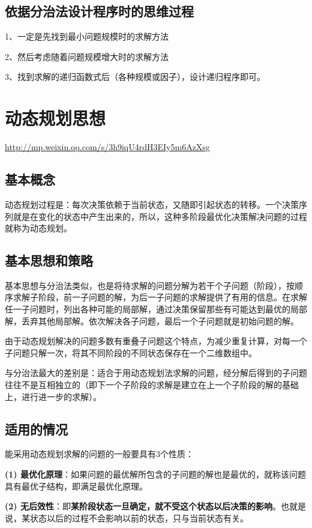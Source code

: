 \documentclass[UTF8,a4paper,12pt]{ctexbook}
\begin{document}
		\subsection{依据分治法设计程序时的思维过程}
			1、一定是先找到最小问题规模时的求解方法
			
			2、然后考虑随着问题规模增大时的求解方法
			
			3、找到求解的递归函数式后（各种规模或因子），设计递归程序即可。
	\section{动态规划思想}
		\url{http://mp.weixin.qq.com/s/3h9iqU4rdH3EIy5m6AzXsg}
		
		\subsection{基本概念}
			动态规划过程是：每次决策依赖于当前状态，又随即引起状态的转移。一个决策序列就是在变化的状态中产生出来的，所以，这种多阶段最优化决策解决问题的过程就称为动态规划。
			
		\subsection{基本思想和策略}
			基本思想与分治法类似，也是将待求解的问题分解为若干个子问题（阶段），按顺序求解子阶段，前一子问题的解，为后一子问题的求解提供了有用的信息。在求解任一子问题时，列出各种可能的局部解，通过决策保留那些有可能达到最优的局部解，丢弃其他局部解。依次解决各子问题，最后一个子问题就是初始问题的解。
			
			由于动态规划解决的问题多数有重叠子问题这个特点，为减少重复计算，对每一个子问题只解一次，将其不同阶段的不同状态保存在一个二维数组中。
			
			与分治法最大的差别是：适合于用动态规划法求解的问题，经分解后得到的子问题往往不是互相独立的（即下一个子阶段的求解是建立在上一个子阶段的解的基础上，进行进一步的求解）。
		\subsection{适用的情况}
			能采用动态规划求解的问题的一般要具有3个性质：
			
			\textbf{(1) 最优化原理}：如果问题的最优解所包含的子问题的解也是最优的，就称该问题具有最优子结构，即满足最优化原理。
			
			\textbf{(2) 无后效性}：即\textbf{某阶段状态一旦确定，就不受这个状态以后决策的影响}。也就是说，某状态以后的过程不会影响以前的状态，只与当前状态有关。
			
\end{document}

